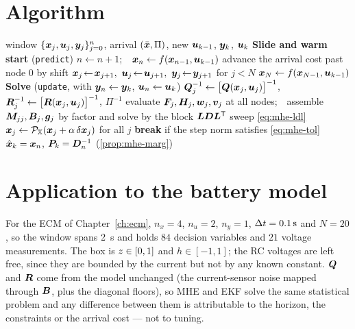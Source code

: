 \section{Algorithm}
\begin{algorithm}[H]
\caption{MHE --- one sampling period}
\begin{algorithmic}[1]
\Require window $\{\bm{x}_j,\bm{u}_j,\bm{y}_j\}_{j=0}^{n}$, arrival $(\bar{\bm{x}},\Pi)$, new $\bm{u}_{k-1}$, $\bm{y}_k$, $\bm{u}_k$
\Statex \textbf{Slide and warm start} (\texttt{predict})
 \State $n\gets n+1$;\ \ $\bm{x}_n \gets f(\bm{x}_{n-1},\bm{u}_{k-1})$
\Else
  \State advance the arrival cost past node $0$ by 
  \State shift $\vx_j\!\gets\!\vx_{j+1},\ \vu_j\!\gets\!\vu_{j+1},\ \vy_j\!\gets\!\vy_{j+1}$ for $j<N$
  \State $\bm{x}_N \gets f(\bm{x}_{N-1},\bm{u}_{k-1})$ 
\EndIf
\Statex \textbf{Solve} (\texttt{update}, with $\bm{y}_n\gets\bm{y}_k$, $\bm{u}_n\gets\bm{u}_k$)
\State $\bm{Q}_j^{-1}\gets \bigl[\bm{Q}(\bm{x}_j,\bm{u}_j)\bigr]^{-1}$, $\bm{R}_j^{-1}\gets\bigl[\bm{R}(\bm{x}_j,\bm{u}_j)\bigr]^{-1}$, $\Pi^{-1}$
  \State evaluate $\bm{F}_j,\bm{H}_j,\bm{w}_j,\bm{v}_j$ at all nodes;\ \ assemble $\bm{M}_{jj},\bm{B}_j,\bm{g}_j$ by
  \State factor and solve by the block $\bm{L}\bm{D}\bm{L}^{\mathsf{T}}$ sweep \cref{eq:mhe-ldl}
  \State $\bm{x}_j \gets \mathcal{P}_{\mathbb{X}}(\bm{x}_j + \alpha\,\delta\bm{x}_j)$ for all $j$ 
  \State \textbf{break} if the step norm satisfies \cref{eq:mhe-tol}
\EndFor
\Ensure $\hat{\bm{x}}_k = \bm{x}_n$, $\bm{P}_k = \bm{D}_n^{-1}$ (\cref{prop:mhe-marg})
\end{algorithmic}
\end{algorithm}

\section{Application to the battery model}
For the ECM of Chapter~\ref{ch:ecm}, $n_x = 4$, $n_u = 2$, $n_y = 1$, $\Delta t = \SI{0.1}{\second}$ and
$N = 20$, so the window spans \SI{2}{\second} and holds $84$ decision variables and $21$ voltage
measurements.  The box is $z\in[0,1]$ and $h\in[-1,1]$; the RC voltages are left free, since they
are bounded by the current but not by any known constant.  $\bm{Q}$ and $\bm{R}$ come from the model
unchanged (the current-sensor noise mapped through $\bm{B}$, plus the diagonal floors), so MHE and EKF
solve the same statistical problem and any difference between them is attributable to the horizon,
the constraints or the arrival cost --- not to tuning.

